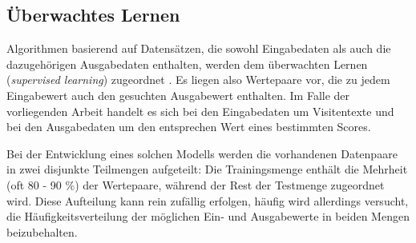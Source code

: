 
    

\begin{figure}[htbp]
    \captionsetup{justification=centering}

    \centering
    
    \centering
    \caption{}
    \label{fig:linear}
\end{figure}

\subsection{Überwachtes Lernen}\label{section:supervised_learning}

Algorithmen basierend auf Datensätzen, die sowohl Eingabedaten als auch die dazugehörigen Ausgabedaten enthalten, werden dem überwachten Lernen (\textit{supervised learning}) zugeordnet \citep{russellArtificialIntelligenceModern2020}. Es liegen also Wertepaare vor, die zu jedem Eingabewert auch den gesuchten Ausgabewert enthalten. Im Falle der vorliegenden Arbeit handelt es sich bei den Eingabedaten um Visitentexte und bei den Ausgabedaten um den entsprechen Wert eines bestimmten Scores. 

Bei der Entwicklung eines solchen Modells werden die vorhandenen Datenpaare in zwei disjunkte Teilmengen aufgeteilt: Die Trainingsmenge enthält die Mehrheit (oft 80 - 90 \%) der Wertepaare, während der Rest der Testmenge zugeordnet wird. Diese Aufteilung kann rein zufällig erfolgen, häufig wird allerdings versucht, die Häufigkeitsverteilung der möglichen Ein- und Ausgabewerte in beiden Mengen beizubehalten.


